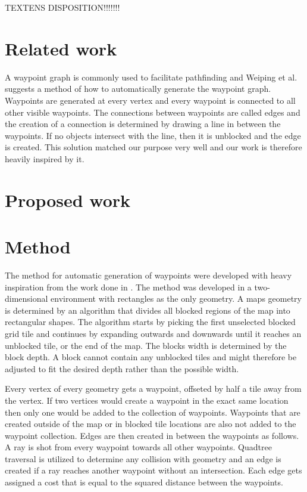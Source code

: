 \documentclass[a4paper]{article}
\begin{document}
TEXTENS DISPOSITION!!!!!!!

\section{Related work}
A waypoint graph is commonly used to facilitate pathfinding and Weiping et al. \cite{dynaPF15} suggests a method of how to automatically generate the waypoint graph. Waypoints are generated at every vertex and every waypoint is connected to all other visible waypoints. The connections between waypoints are called edges \cite{dynaPF15} and the creation of a connection is determined by drawing a line in between the waypoints. If no objects intersect with the line, then it is unblocked and the edge is created. This solution matched our purpose very well and our work is therefore heavily inspired by it.

\section{Proposed work}

\section{Method}
The method for automatic generation of waypoints were developed with heavy inspiration from the work done in \cite{dynaPF15}. The method was developed in a two-dimensional environment with rectangles as the only geometry. A maps geometry is determined by an algorithm that divides all blocked regions of the map into rectangular shapes. The algorithm starts by picking the first unselected blocked grid tile and continues by expanding outwards and downwards until it reaches an unblocked tile, or the end of the map. The blocks width is determined by the block depth. A block cannot contain any unblocked tiles and might therefore be adjusted to fit the desired depth rather than the possible width.

Every vertex of every geometry gets a waypoint, offseted by half a tile away from the vertex. If two vertices would create a waypoint in the exact same location then only one would be added to the collection of waypoints. Waypoints that are created outside of the map or in blocked tile locations are also not added to the waypoint collection. Edges are then created in between the waypoints as follows. A ray is shot from every waypoint towards all other waypoints. Quadtree traversal is utilized to determine any collision with geometry and an edge is created if a ray reaches another waypoint without an intersection. Each edge gets assigned a cost that is equal to the squared distance between the waypoints.
	
\end{document}
